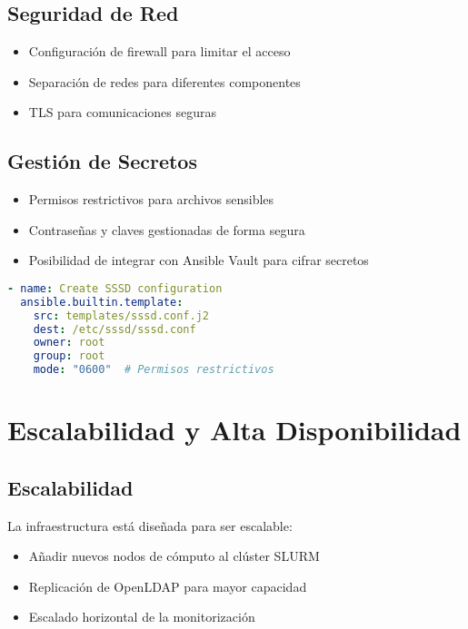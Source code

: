 \documentclass[12pt,a4paper]{article}
\begin{document}
\subsection{Seguridad de Red}

\begin{itemize}[leftmargin=*]
    \item Configuración de firewall para limitar el acceso
    \item Separación de redes para diferentes componentes
    \item TLS para comunicaciones seguras
\end{itemize}

\subsection{Gestión de Secretos}

\begin{itemize}[leftmargin=*]
    \item Permisos restrictivos para archivos sensibles
    \item Contraseñas y claves gestionadas de forma segura
    \item Posibilidad de integrar con Ansible Vault para cifrar secretos
\end{itemize}

\begin{lstlisting}[language=yaml, caption=Configuración de permisos restrictivos]
- name: Create SSSD configuration
  ansible.builtin.template:
    src: templates/sssd.conf.j2
    dest: /etc/sssd/sssd.conf
    owner: root
    group: root
    mode: "0600"  # Permisos restrictivos
\end{lstlisting}

\section{Escalabilidad y Alta Disponibilidad}
\newpage

\subsection{Escalabilidad}

La infraestructura está diseñada para ser escalable:

\begin{itemize}[leftmargin=*]
    \item Añadir nuevos nodos de cómputo al clúster SLURM
    \item Replicación de OpenLDAP para mayor capacidad
    \item Escalado horizontal de la monitorización
\end{itemize}
\end{document}
